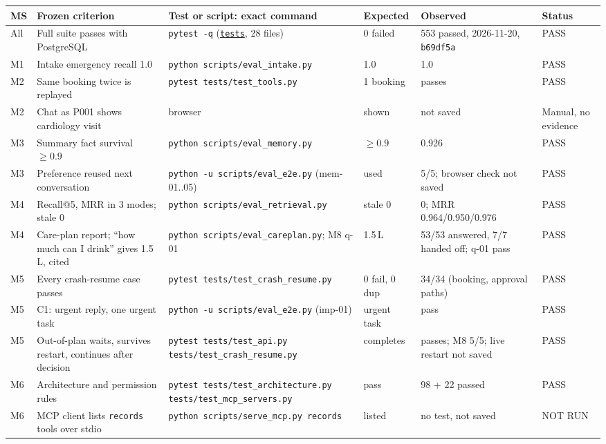 \documentclass[10pt,a4paper]{article}
\renewcommand{\arraystretch}{1.15}
\newcommand{\repourl}{https://github.com/saideepaksana/careflow}
\newcommand{\rev}{cs5903-final-2026}
\newcommand{\dir}[1]{\href{\repourl/tree/\rev/#1}{\nolinkurl{#1}}}
\newcommand{\cmd}[1]{\nolinkurl{#1}}
\begin{document}
\begin{table}[htbp]
\centering
\scriptsize
\renewcommand{\arraystretch}{1.1}
\begin{tabularx}{\textwidth}{P{0.55cm} P{3.4cm} P{4.2cm} P{1.3cm} L P{1.3cm}}
\toprule
\textbf{MS} & \textbf{Frozen criterion} & \textbf{Test or script: exact command} & \textbf{Expected} & \textbf{Observed} & \textbf{Status} \\
\midrule
All & Full suite passes with PostgreSQL & \cmd{pytest -q} (\dir{tests}, 28 files) & 0 failed & 553 passed, 2026-11-20, \texttt{b69df5a} & PASS \\
M1 & Intake emergency recall 1.0 & \cmd{python scripts/eval_intake.py} & 1.0 & 1.0 & PASS \\
M2 & Same booking twice is replayed & \cmd{pytest tests/test_tools.py} & 1 booking & passes & PASS \\
M2 & Chat as P001 shows cardiology visit & browser & shown & not saved & Manual, no evidence \\
M3 & Summary fact survival $\geq 0.9$ & \cmd{python scripts/eval_memory.py} & $\geq 0.9$ & 0.926 & PASS \\
M3 & Preference reused next conversation & \cmd{python -u scripts/eval_e2e.py} (mem-01..05) & used & 5/5; browser check not saved & PASS \\
M4 & Recall@5, MRR in 3 modes; stale 0 & \cmd{python scripts/eval_retrieval.py} & stale 0 & 0; MRR 0.964/0.950/0.976 & PASS \\
M4 & Care-plan report; ``how much can I drink'' gives 1.5\,L, cited & \cmd{python scripts/eval_careplan.py}; M8 q-01 & 1.5\,L & 53/53 answered, 7/7 handed off; q-01 pass & PASS \\
M5 & Every crash-resume case passes & \cmd{pytest tests/test_crash_resume.py} & 0 fail, 0 dup & 34/34 (booking, approval paths) & PASS \\
M5 & C1: urgent reply, one urgent task & \cmd{python -u scripts/eval_e2e.py} (imp-01) & urgent task & pass & PASS \\
M5 & Out-of-plan waits, survives restart, continues after decision & \cmd{pytest tests/test_api.py tests/test_crash_resume.py} & completes & passes; M8 5/5; live restart not saved & PASS \\
M6 & Architecture and permission rules & \cmd{pytest tests/test_architecture.py tests/test_mcp_servers.py} & pass & 98 + 22 passed & PASS \\
M6 & MCP client lists \texttt{records} tools over stdio & \cmd{python scripts/serve_mcp.py records} & listed & no test, not saved & NOT RUN \\

\end{tabularx}
\end{table}
\end{document}

